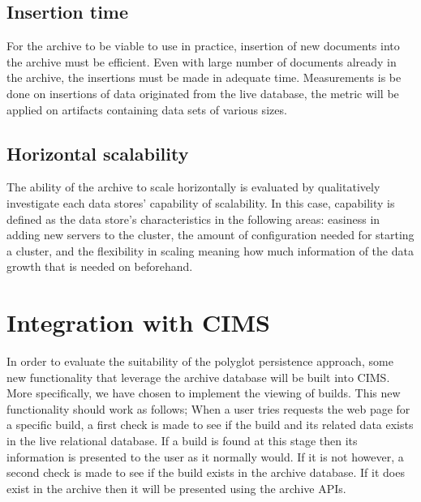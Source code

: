 \subsection{Insertion time}
For the archive to be viable to use in practice, insertion of new documents into the archive must be efficient. Even with large number of documents already in the archive, the insertions must be made in adequate time. Measurements is be done on insertions of data originated from the live database, the metric will be applied on artifacts containing data sets of various sizes.

\subsection{Horizontal scalability}
The ability of the archive to scale horizontally is evaluated by qualitatively investigate each data stores' capability of scalability. In this case, capability is defined as the data store's characteristics in the following areas: easiness in adding new servers to the cluster, the amount of configuration needed for starting a cluster, and the flexibility in scaling meaning how much information of the data growth that is needed on beforehand.   

\section{Integration with CIMS}
In order to evaluate the suitability of the polyglot persistence approach, some new functionality that leverage the archive database will be built into CIMS. More specifically, we have chosen to implement the viewing of builds. This new functionality should work as follows; When a user tries requests the web page for a specific build, a first check is made to see if the build and its related data exists in the live relational database. If a build is found at this stage then its information is presented to the user as it normally would. If it is not however, a second check is made to see if the build exists in the archive database. If it does exist in the archive then it will be presented using the archive APIs.


